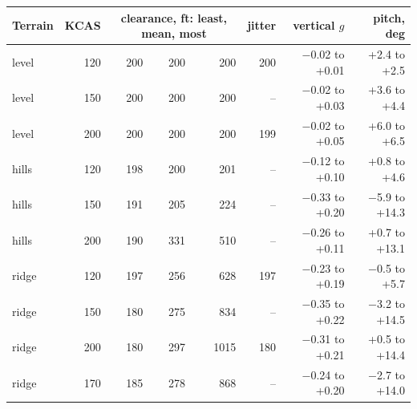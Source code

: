 \begin{tabular}{@{}lrrrrrrr@{}}
\toprule
Terrain & KCAS & \multicolumn{3}{c}{clearance, ft: least, mean, most} & jitter & vertical $g$ & pitch, deg \\
\midrule
level & 120 & 200 & 200 & 200 & 200 & $-$0.02 to +0.01 & +2.4 to +2.5 \\
level & 150 & 200 & 200 & 200 & -- & $-$0.02 to +0.03 & +3.6 to +4.4 \\
level & 200 & 200 & 200 & 200 & 199 & $-$0.02 to +0.05 & +6.0 to +6.5 \\
hills & 120 & 198 & 200 & 201 & -- & $-$0.12 to +0.10 & +0.8 to +4.6 \\
hills & 150 & 191 & 205 & 224 & -- & $-$0.33 to +0.20 & $-$5.9 to +14.3 \\
hills & 200 & 190 & 331 & 510 & -- & $-$0.26 to +0.11 & +0.7 to +13.1 \\
ridge & 120 & 197 & 256 & 628 & 197 & $-$0.23 to +0.19 & $-$0.5 to +5.7 \\
ridge & 150 & 180 & 275 & 834 & -- & $-$0.35 to +0.22 & $-$3.2 to +14.5 \\
ridge & 200 & 180 & 297 & 1015 & 180 & $-$0.31 to +0.21 & +0.5 to +14.4 \\
ridge & 170 & 185 & 278 & 868 & -- & $-$0.24 to +0.20 & $-$2.7 to +14.0 \\
\bottomrule
\end{tabular}
